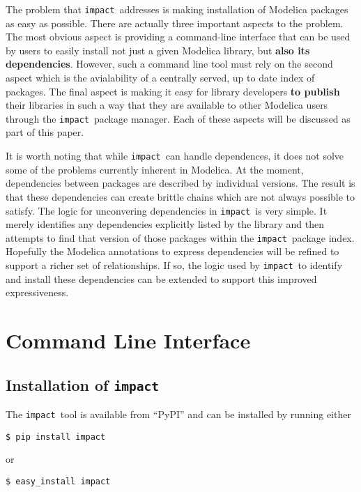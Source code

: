 \documentclass[11pt,a4paper,twocolumn]{article}
\newcommand{\impact}{\texttt{impact}} %
\begin{document}
The problem that \impact\ addresses is making installation of Modelica
packages as easy as possible.  There are actually three important
aspects to the problem.  The most obvious aspect is providing a
command-line interface that can be used by users to easily install not
just a given Modelica library, but \textbf{also its dependencies}.
However, such a command line tool must rely on the second aspect which
is the avialability of a centrally served, up to date index of
packages.  The final aspect is making it easy for library developers
\textbf{to publish} their libraries in such a way that they are
available to other Modelica users through the \impact\ package
manager.  Each of these aspects will be discussed as part of this
paper.

It is worth noting that while \impact\ can handle dependences, it
does not solve some of the problems currently inherent in Modelica.  At
the moment, dependencies between packages are described by individual
versions.  The result is that these dependencies can create brittle
chains which are not always possible to satisfy. The logic for
unconvering dependencies in \impact\ is very simple.  It merely
identifies any dependencies explicitly listed by the library and then
attempts to find that version of those packages within the
\impact\ package index. Hopefully the Modelica annotations to express
dependencies will be refined to support a richer set of relationships.
If so, the logic used by \impact\ to identify and install these
dependencies can be extended to support this improved expressiveness.

\section{Command Line Interface}
\label{sec:command_line}

\subsection{Installation of \impact}
\label{sec:install}

The \impact\ tool is available from ``PyPI''\cite{pypi} and can be
installed by running either

\begin{verbatim}
$ pip install impact
\end{verbatim}
or
\begin{verbatim}
$ easy_install impact
\end{verbatim}
\end{document}
